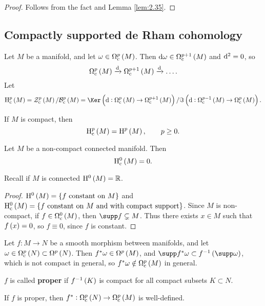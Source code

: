 \begin{proof}
Follows from the fact and Lemma \ref{lem:2.35}.
\end{proof}

\subsection{Compactly supported de Rham cohomology}

Let $ M $ be a manifold, and let $ \omega \in \Omega_\c^p\br{M} $. Then $ \d\omega \in \Omega_\c^{p + 1}\br{M} $ and $ \mathrm{d}^2 = 0 $, so
$$ \Omega_\c^p\br{M} \xrightarrow{\d} \Omega_\c^{p + 1}\br{M} \xrightarrow{\d} \dots. $$
Let
$$ \H_\c^p\br{M} = \ZZZ_\c^p\br{M} / \BBB_\c^p\br{M} = \Ker \br{\d : \Omega_\c^p\br{M} \to \Omega_\c^{p + 1}\br{M}} / \Im \br{\d : \Omega_\c^{p - 1}\br{M} \to \Omega_\c^p\br{M}}. $$

\begin{example*}
If $ M $ is compact, then
$$ \H_\c^p\br{M} = \H^p\br{M}, \qquad p \ge 0. $$
\end{example*}

\begin{lemma}
Let $ M $ be a non-compact connected manifold. Then
$$ \H_\c^0\br{M} = 0. $$
\end{lemma}

Recall if $ M $ is connected $ \H^0\br{M} = \RR $.

\begin{proof}
$ \H^0\br{M} = \cbr{f \ \text{constant on} \ M} $ and $ \H_\c^0\br{M} = \cbr{f \ \text{constant on} \ M \ \text{and with compact support}} $. Since $ M $ is non-compact, if $ f \in \Omega_\c^0\br{M} $, then $ \supp f \subsetneq M $. Thus there exists $ x \in M $ such that $ f\br{x} = 0 $, so $ f \equiv 0 $, since $ f $ is constant.
\end{proof}

Let $ f : M \to N $ be a smooth morphism between manifolds, and let $ \omega \in \Omega_\c^p\br{N} \subset \Omega^p\br{N} $. Then $ f^*\omega \in \Omega^p\br{M} $, and $ \supp f^*\omega \subset f^{-1}\br{\supp \omega} $, which is not compact in general, so $ f^*\omega \notin \Omega_\c^p\br{M} $ in general.

\begin{definition}
$ f $ is called \textbf{proper} if $ f^{-1}\br{K} $ is compact for all compact subsets $ K \subset N $.
\end{definition}

If $ f $ is proper, then $ f^* : \Omega_\c^p\br{N} \to \Omega_\c^p\br{M} $ is well-defined.

